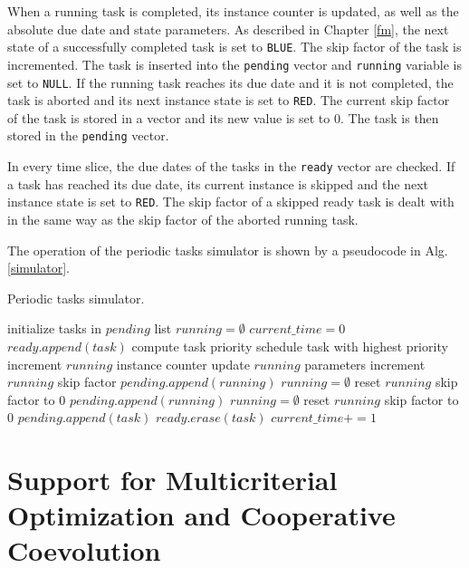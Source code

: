 When a running task is completed,
its instance counter is updated, as well as the absolute due date and state parameters.
As described in Chapter \ref{fm}, the next state of a successfully completed task is set to 
\texttt{BLUE}.
The skip factor of the task is incremented.
The task is inserted into the \texttt{pending} vector and \texttt{running} variable is set to \texttt{NULL}.
If the running task reaches its due date and it is not completed, the task is aborted and its next instance state is set to \texttt{RED}.
The current skip factor of the task is stored in a vector and its new value is set to $0$.
The task is then stored in the \texttt{pending} vector.

In every time slice, the due dates of the tasks in the \texttt{ready} vector are checked.
If a task has reached its due date, its current instance is skipped and the next instance state is set to \texttt{RED}.
The skip factor of a skipped ready task is dealt with in the same way as the skip factor of the aborted running task.

The operation of the periodic tasks simulator is shown by a pseudocode in Alg. \ref{simulator}.
\begin{algorithm}
\caption{Periodic tasks simulator.\label{simulator}}
\begin{algorithmic}[1]
\State initialize tasks in $pending$ list
\State $running = \emptyset$
\State $current\_time = 0$
			\State $ready.append(task)$
		\EndIf
	\EndFor
		\State compute task priority
	\EndFor
	\State schedule task with highest priority
			\State increment $running$ instance counter
			\State update $running$ parameters
			\State increment $running$ skip factor
			\State $pending.append(running)$
			\State $running = \emptyset$
		\Else 
				\State reset $running$ skip factor to $0$
				\State $pending.append(running)$
				\State $running = \emptyset$ 
			\EndIf
		\EndIf
	\EndIf
			\State reset $running$ skip factor to $0$
			\State $pending.append(task)$
			\State $ready.erase(task)$
		\EndIf
	\EndFor
	\State $current\_time+=1$
\EndWhile
\end{algorithmic}
\end{algorithm}

\section{Support for Multicriterial Optimization and Cooperative Coevolution}
